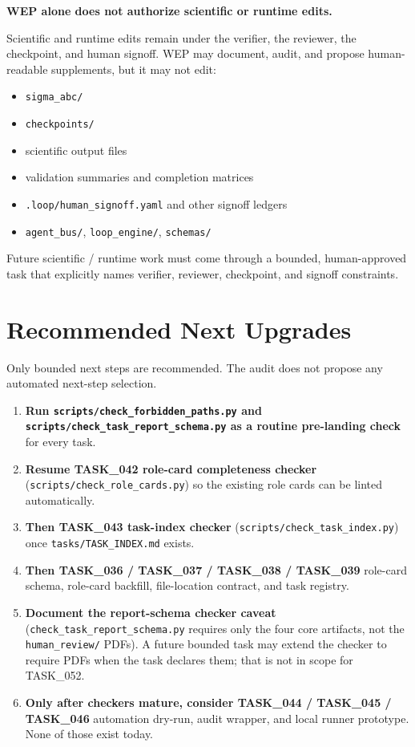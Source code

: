 \documentclass[11pt,a4paper]{article}
\begin{document}
\textbf{WEP alone does not authorize scientific or runtime edits.}

Scientific and runtime edits remain under the verifier, the reviewer,
the checkpoint, and human signoff. WEP may document, audit, and propose
human-readable supplements, but it may not edit:

\begin{itemize}[leftmargin=2em]
  \item \texttt{sigma\_abc/}
  \item \texttt{checkpoints/}
  \item scientific output files
  \item validation summaries and completion matrices
  \item \texttt{.loop/human\_signoff.yaml} and other signoff ledgers
  \item \texttt{agent\_bus/}, \texttt{loop\_engine/}, \texttt{schemas/}
\end{itemize}

Future scientific / runtime work must come through a bounded,
human-approved task that explicitly names verifier, reviewer,
checkpoint, and signoff constraints.

\section{Recommended Next Upgrades}

Only bounded next steps are recommended. The audit does not propose any
automated next-step selection.

\begin{enumerate}[leftmargin=2em]
  \item \textbf{Run \texttt{scripts/check\_forbidden\_paths.py} and
        \texttt{scripts/check\_task\_report\_schema.py} as a routine
        pre-landing check} for every task.
  \item \textbf{Resume TASK\_042 role-card completeness checker}
        (\texttt{scripts/check\_role\_cards.py}) so the existing role
        cards can be linted automatically.
  \item \textbf{Then TASK\_043 task-index checker}
        (\texttt{scripts/check\_task\_index.py}) once
        \texttt{tasks/TASK\_INDEX.md} exists.
  \item \textbf{Then TASK\_036 / TASK\_037 / TASK\_038 / TASK\_039}
        role-card schema, role-card backfill, file-location contract,
        and task registry.
  \item \textbf{Document the report-schema checker caveat}
        (\texttt{check\_task\_report\_schema.py} requires only the four
        core artifacts, not the \texttt{human\_review/} PDFs). A future
        bounded task may extend the checker to require PDFs when the
        task declares them; that is not in scope for TASK\_052.
  \item \textbf{Only after checkers mature, consider TASK\_044 /
        TASK\_045 / TASK\_046} automation dry-run, audit wrapper, and
        local runner prototype. None of those exist today.
\end{enumerate}
\end{document}
